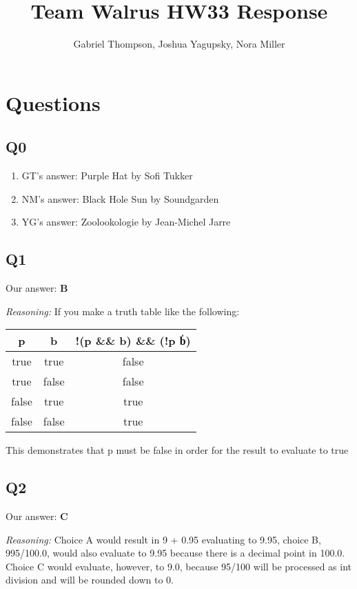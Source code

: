 \documentclass{article}
\title{Team Walrus HW33 Response}
\author{Gabriel Thompson, Joshua Yagupsky, Nora Miller}
\begin{document}
\maketitle

\section{Questions}

\subsection{Q0}

\begin{enumerate}
    \item[] GT's answer: Purple Hat by Sofi Tukker
    \item[] NM's answer: Black Hole Sun by Soundgarden
    \item[] YG's answer: Zoolookologie by Jean-Michel Jarre
\end{enumerate}

\subsection{Q1}

Our answer: \textbf{B}

\noindent\textit{Reasoning:} If you make a truth table like the following:
\begin{center}
\begin{tabular}{||c c c||} 
 \hline
 p & b & !(p \&\& b) \&\& (!p \|\| b) \\ [0.5ex] 
 \hline\hline
 true & true & false \\ 
 \hline
 true & false & false \\ 
 \hline
 false & true & true \\ 
 \hline
 false & false & true \\ 
 \hline
\end{tabular}
\end{center}
This demonstrates that p must be false in order for the result to evaluate to true

\subsection{Q2}

Our answer: \textbf{C}

\noindent\textit{Reasoning:} Choice A would result in 9 + 0.95 evaluating to 9.95, choice B, 995/100.0, would also evaluate to 9.95 because there is a decimal point in 100.0. Choice C would evaluate, however, to 9.0, because 95/100 will be processed as int division and will be rounded down to 0.
\end{document}
